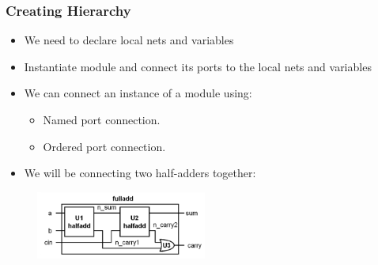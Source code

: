 \documentclass[t, notes]{beamer}
\begin{document}
\begin{frame}
\frametitle{Creating Hierarchy}

\begin{itemize}
\item We need to declare local nets and variables
\item Instantiate module and connect its ports to the local nets and variables
\item We can connect an instance of a module using:
\begin{itemize}
	\item Named port connection.
	\item Ordered port connection.
\end{itemize}
\item We will be connecting two half-adders together:
\end{itemize}

\begin{figure}[H!]
    \includegraphics[width=0.5\textwidth]{img/03_fulladd.png}
\end{figure}

\end{frame}
\end{document}
